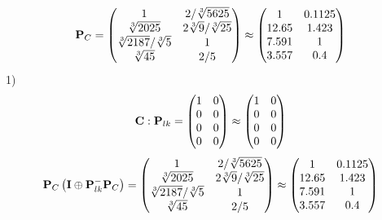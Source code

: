 \documentclass[10pt,a4paper]{article}
\begin{document}
	\[
		\bold{P}_{C} = 
		\begin{pmatrix}
			{1}{} & {{2}} / {\sqrt[3]{5625}} \\
			{\sqrt[3]{2025}}{} & {{2}\sqrt[3]{9}} / {\sqrt[3]{25}} \\
			{\sqrt[3]{2187}} / {\sqrt[3]{5}} & {1}{} \\
			{\sqrt[3]{45}}{} & {{2}} / {{5}} \\
		\end{pmatrix}
		\approx
		\begin{pmatrix}
			1        & 0.1125   \\
			12.65    & 1.423    \\
			7.591    & 1        \\
			3.557    & 0.4      \\
		\end{pmatrix}
	\]
	1)
	\[
		\bold{C}: \bold{P}_{lk} = 
		\begin{pmatrix}
			{1}{} & {{0}}{} \\
			{{0}}{} & {{0}}{} \\
			{{0}}{} & {{0}}{} \\
			{{0}}{} & {{0}}{} \\
		\end{pmatrix}
		\approx
		\begin{pmatrix}
			1        & 0        \\
			0        & 0        \\
			0        & 0        \\
			0        & 0        \\
		\end{pmatrix}
	\]
	\[
		\bold{P}_{C}\left(\bold{I} \oplus \bold{P}_{lk}^{-}\bold{P}_{C}\right) = 
		\begin{pmatrix}
			{1}{} & {{2}} / {\sqrt[3]{5625}} \\
			{\sqrt[3]{2025}}{} & {{2}\sqrt[3]{9}} / {\sqrt[3]{25}} \\
			{\sqrt[3]{2187}} / {\sqrt[3]{5}} & {1}{} \\
			{\sqrt[3]{45}}{} & {{2}} / {{5}} \\
		\end{pmatrix}
		\approx
		\begin{pmatrix}
			1        & 0.1125   \\
			12.65    & 1.423    \\
			7.591    & 1        \\
			3.557    & 0.4      \\
		\end{pmatrix}
	\]
\end{document}
